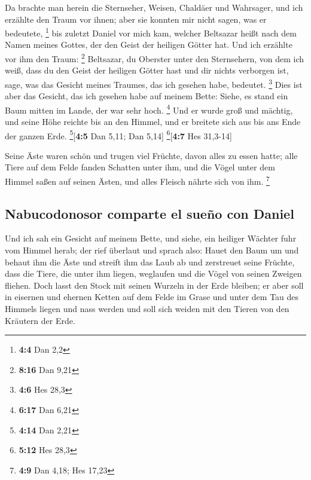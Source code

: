  Da brachte man herein die Sternseher, Weisen, Chaldäer
und Wahrsager, und ich erzählte den Traum vor ihnen; aber sie konnten
mir nicht sagen, was er bedeutete, \footnote{\textbf{4:4} Dan 2,2}
 bis zuletzt Daniel vor mich kam, welcher Beltsazar heißt
nach dem Namen meines Gottes, der den Geist der heiligen Götter hat. Und
ich erzählte vor ihm den Traum: \footnote{\textbf{8:16} Dan 9,21}
 Beltsazar, du Oberster unter den Sternsehern, von dem ich
weiß, dass du den Geist der heiligen Götter hast und dir nichts
verborgen ist, sage, was das Gesicht meines Traumes, das ich gesehen
habe, bedeutet. \footnote{\textbf{4:6} Hes 28,3}  Dies ist
aber das Gesicht, das ich gesehen habe auf meinem Bette: Siehe, es stand
ein Baum mitten im Lande, der war sehr hoch. \footnote{\textbf{6:17} Dan
  6,21}  Und er wurde groß und mächtig, und seine Höhe
reichte bis an den Himmel, und er breitete sich aus bis ans Ende der
ganzen Erde. \footnote{\textbf{4:14} Dan 2,21}{[}\textbf{4:5} Dan 5,11;
Dan 5,14{]} \footnote{\textbf{5:12} Hes 28,3}{[}\textbf{4:7} Hes
31,3-14{]}

 Seine Äste waren schön und trugen viel Früchte, davon
alles zu essen hatte; alle Tiere auf dem Felde fanden Schatten unter
ihm, und die Vögel unter dem Himmel saßen auf seinen Ästen, und alles
Fleisch nährte sich von ihm. \footnote{\textbf{4:9} Dan 4,18; Hes 17,23}

\hypertarget{nabucodonosor-comparte-el-sueuxf1o-con-daniel}{%
\subsection{Nabucodonosor comparte el sueño con
Daniel}\label{nabucodonosor-comparte-el-sueuxf1o-con-daniel}}

 Und ich sah ein Gesicht auf meinem Bette, und siehe, ein
heiliger Wächter fuhr vom Himmel herab;  der rief
überlaut und sprach also: Hauet den Baum um und behaut ihm die Äste und
streift ihm das Laub ab und zerstreuet seine Früchte, dass die Tiere,
die unter ihm liegen, weglaufen und die Vögel von seinen Zweigen
fliehen.  Doch lasst den Stock mit seinen Wurzeln in der
Erde bleiben; er aber soll in eisernen und ehernen Ketten auf dem Felde
im Grase und unter dem Tau des Himmels liegen und nass werden und soll
sich weiden mit den Tieren von den Kräutern der Erde.

